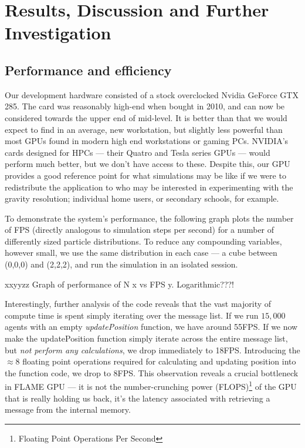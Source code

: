 \documentclass[11pt,a4paper]{article}
\begin{document}
\section{Results, Discussion and Further Investigation}
\label{results}

\subsection{Performance and efficiency}
Our development hardware consisted of a stock overclocked Nvidia GeForce GTX 285. The card was reasonably high-end when bought in 2010, and can now be considered towards the upper end of mid-level. It is better than that we would expect to find in an average, new workstation, but slightly less powerful than most GPUs found in modern high end workstations or gaming PCs. NVIDIA's cards designed for HPCs --- their Quatro and Tesla series GPUs --- would perform much better, but we don't have access to these. Despite this, our GPU provides a good reference point for what simulations may be like if we were to redistribute the application to who may be interested in experimenting with the gravity resolution; individual home users, or secondary schools, for example.

To demonstrate the system's performance, the following graph plots the number of FPS (directly analogous to simulation steps per second) for a number of differently sized particle distributions. To reduce any compounding variables, however small, we use the same distribution in each case --- a cube between (0,0,0) and (2,2,2), and run the simulation in an isolated session.

xxyyzz Graph of performance of N x vs FPS y. Logarithmic???!

Interestingly, further analysis of the code reveals that the vast majority of compute time is spent simply iterating over the message list. If we run $15,000$ agents with an empty \emph{updatePosition} function, we have around 55FPS. If we now make the updatePosition function simply iterate across the entire message list, but \emph{not perform any calculations}, we drop immediately to 18FPS. Introducing the $\approx 8$ floating point operations required for calculating and updating position into the function code, we drop to 8FPS. This observation reveals a crucial bottleneck in FLAME GPU --- it is not the number-crunching power (FLOPS)\footnote{Floating Point Operations Per Second} of the GPU that is really holding us back, it's the latency associated with retrieving a message from the internal memory.
\end{document}
